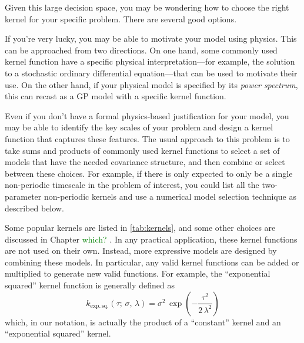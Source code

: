 \documentclass[letterpaper]{ar-1col}
\newcommand{\dan}[1]{\textcolor{green}{#1}}
\begin{document}
Given this large decision space, you may be wondering how to choose the right kernel for your specific problem.
There are several good options.

If you're very lucky, you may be able to motivate your model using physics.
This can be approached from two directions.
On one hand, some commonly used kernel function have a specific physical interpretation---for example, the solution to a stochastic ordinary differential equation---that can be used to motivate their use.
On the other hand, if your physical model is specified by its \emph{power spectrum}, this can recast as a GP model with a specific kernel function.

Even if you don't have a formal physics-based justification for your model, you may be able to identify the key scales of your problem and design a kernel function that captures these features.
The usual approach to this problem is to take sums and products of commonly used kernel functions to select a set of  models that have the needed covariance structure, and then combine or select between these choices.
For example, if there is only expected to only be a single non-periodic timescale in the problem of interest, you could list all the two-parameter non-periodic kernels and use a numerical model selection technique as described below.

Some popular kernels are listed in \autoref{tab:kernels}, and some other choices are discussed in Chapter \dan{which?} \citet{gpml}.
In any practical application, these kernel functions are not used on their own.
Instead, more expressive models are designed by combining these models.
In particular, any valid kernel functions can be added or multiplied to generate new valid functions.
For example, the ``exponential squared'' kernel function is generally defined as
\begin{equation}
    k_\mathrm{exp.\,sq.}(\tau;\,\sigma,\,\lambda) = \sigma^2\,\exp\left(-\frac{\tau^2}{2\,\lambda^2}\right)
\end{equation}
which, in our notation, is actually the product of a ``constant'' kernel and an ``exponential squared'' kernel.

\end{document}
